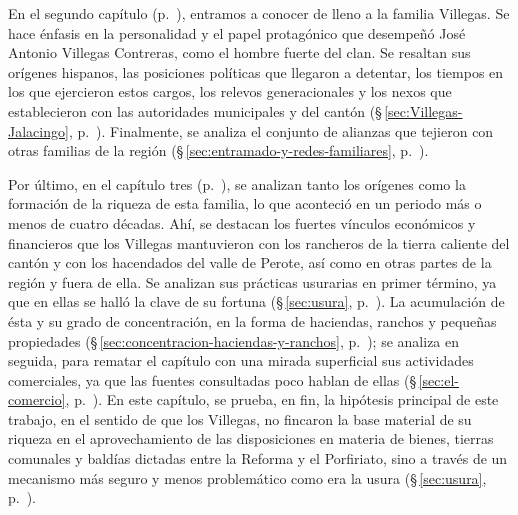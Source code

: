 \documentclass[14pt,twoside,final]{extbook} %
\begin{document}
En el segundo capítulo (p.~\pageref{ch:capitulo-dos}), entramos a conocer de lleno a la familia Villegas. Se hace énfasis en la personalidad y el papel protagónico que desempeñó José Antonio Villegas Contreras, como el hombre fuerte del clan. Se resaltan sus orígenes hispanos, las posiciones políticas que llegaron a detentar, los tiempos en los que ejercieron estos cargos, los relevos generacionales y los nexos que establecieron con las autoridades municipales y del cantón (\S\,\ref{sec:Villegas-Jalacingo}, p.~\pageref{sec:Villegas-Jalacingo}). Finalmente, se analiza el conjunto de alianzas que tejieron con otras familias de la región (\S\,\ref{sec:entramado-y-redes-familiares}, p.~\pageref{sec:entramado-y-redes-familiares}).

Por último, en el capítulo tres (p.~\pageref{ch:capitulo-tres}), se analizan tanto los orígenes como la formación de la riqueza de esta familia, lo que aconteció en un periodo más o menos de cuatro décadas. Ahí, se destacan los fuertes vínculos económicos y financieros que los Villegas mantuvieron con los rancheros de la tierra caliente del cantón y con los hacendados del valle de Perote, así como en otras partes de la región y fuera de ella. Se analizan sus prácticas usurarias en primer término, ya que en ellas se halló la clave de su fortuna (\S\,\ref{sec:usura}, p.~\pageref{sec:usura}). La acumulación de ésta y su grado de concentración, en la forma de haciendas, ranchos y pequeñas propiedades (\S\,\ref{sec:concentracion-haciendas-y-ranchos}, p.~\pageref{sec:concentracion-haciendas-y-ranchos}); se analiza en seguida, para rematar el capítulo con una mirada superficial sus actividades comerciales, ya que las fuentes consultadas poco hablan de ellas (\S\,\ref{sec:el-comercio}, p.~\pageref{sec:el-comercio}). En este capítulo, se prueba, en fin, la hipótesis principal de este trabajo, en el sentido de que los Villegas, no fincaron la base material de su riqueza en el aprovechamiento de las disposiciones en materia de bienes, tierras comunales y baldías dictadas entre la Reforma y el Porfiriato, sino a través de un mecanismo más seguro y menos problemático como era la usura (\S\,\ref{sec:usura}, p.~\pageref{sec:usura}).
\newpage
\pagestyle{empty}
\null\vfill
\newpage
\pagestyle{empty}
\end{document}
